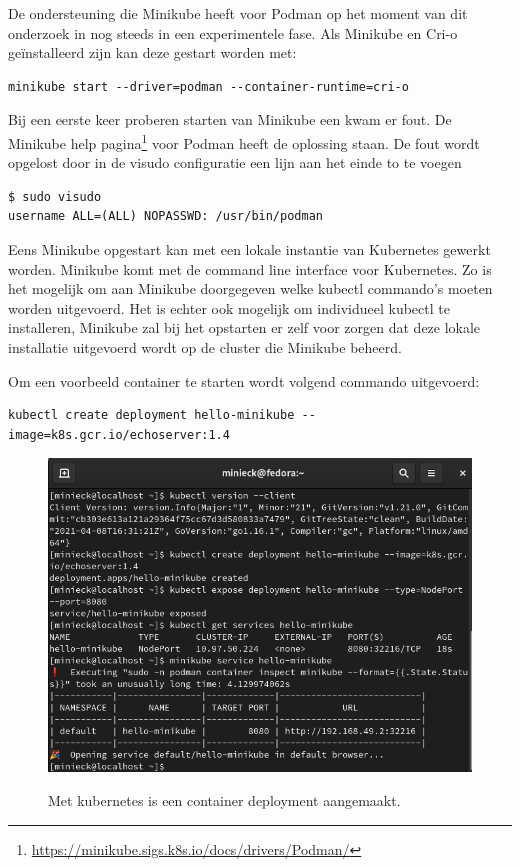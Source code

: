 De ondersteuning die Minikube heeft voor Podman op het moment van dit onderzoek in nog steeds in een experimentele fase. Als Minikube en Cri-o geïnstalleerd zijn kan deze gestart worden met:
\begin{verbatim}
minikube start --driver=podman --container-runtime=cri-o
\end{verbatim}
Bij een eerste keer proberen starten van Minikube een kwam er fout. De Minikube help pagina\footnote{\url{https://minikube.sigs.k8s.io/docs/drivers/Podman/}} voor Podman heeft de oplossing staan. De fout wordt opgelost door in de visudo configuratie een lijn aan het einde to te voegen
\begin{verbatim}
$ sudo visudo
username ALL=(ALL) NOPASSWD: /usr/bin/podman
\end{verbatim}

Eens Minikube opgestart kan met een lokale instantie van Kubernetes gewerkt worden. Minikube komt met de command line interface voor Kubernetes. Zo is het mogelijk om aan Minikube doorgegeven welke kubectl commando’s moeten worden uitgevoerd. Het is echter ook mogelijk om individueel kubectl te installeren, Minikube zal bij het opstarten er zelf voor zorgen dat deze lokale installatie uitgevoerd wordt op de cluster die Minikube beheerd.

Om een voorbeeld container te starten wordt volgend commando uitgevoerd:
\begin{verbatim}
kubectl create deployment hello-minikube --image=k8s.gcr.io/echoserver:1.4
\end{verbatim}
\begin{figure}[h]
    \includegraphics[width=\linewidth]{img/hellokube.png}
    \label{fig:hellokube}
    \caption[Het opstarten van een contianer met kubectl]{Met kubernetes is een container deployment aangemaakt.}
    \centering
\end{figure}

